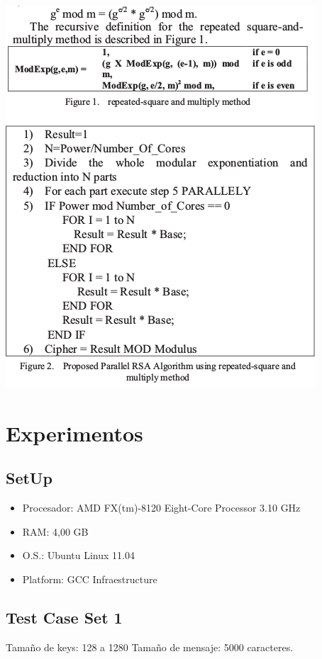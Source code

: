 \documentclass[a4paper,12pt]{article}
\begin{document}
\includegraphics[scale = 0.5]{1.png}

\section{Experimentos}

\subsection{SetUp}
\begin{itemize}
 \item Procesador: AMD FX(tm)-8120 Eight-Core Processor 3.10 GHz
 \item RAM: 4,00 GB
 \item O.S.: Ubuntu Linux 11.04
 \item Platform: GCC Infraestructure
\end{itemize}

\subsection{Test Case Set 1}

Tamaño de keys: 128 a 1280
Tamaño de mensaje: 5000 caracteres.
\end{document}
